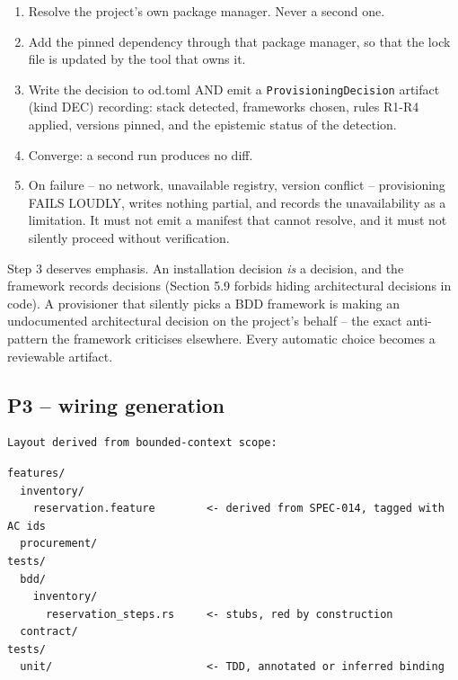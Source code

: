 \documentclass[11pt,a4paper]{article}
\begin{document}
\begin{enumerate}[leftmargin=*,nosep,topsep=2pt]
\item Resolve the project's own package manager. Never a second one.
\item Add the pinned dependency through that package manager, so that the lock    file is updated by the tool that owns it.
\item Write the decision to od.toml AND emit a \texttt{ProvisioningDecision} artifact    (kind DEC) recording: stack detected, frameworks chosen, rules R1-R4    applied, versions pinned, and the epistemic status of the detection.
\item Converge: a second run produces no diff.
\item On failure -- no network, unavailable registry, version conflict --    provisioning FAILS LOUDLY, writes nothing partial, and records the    unavailability as a limitation. It must not emit a manifest that cannot    resolve, and it must not silently proceed without verification.
\end{enumerate}

Step 3 deserves emphasis. An installation decision \emph{is} a decision, and the framework records decisions (Section 5.9 forbids hiding architectural decisions in code). A provisioner that silently picks a BDD framework is making an undocumented architectural decision on the project's behalf -- the exact anti-pattern the framework criticises elsewhere. Every automatic choice becomes a reviewable artifact.

\subsection{P3 -- wiring generation}

\begin{Verbatim}[fontsize=\footnotesize,breaklines=true,breakanywhere=true,breakautoindent=false,samepage=false]
Layout derived from bounded-context scope:
\end{Verbatim}

\begin{Verbatim}[fontsize=\footnotesize,breaklines=true,breakanywhere=true,breakautoindent=false,samepage=false]
features/
  inventory/
    reservation.feature        <- derived from SPEC-014, tagged with AC ids
  procurement/
tests/
  bdd/
    inventory/
      reservation_steps.rs     <- stubs, red by construction
  contract/
tests/
  unit/                        <- TDD, annotated or inferred binding
\end{Verbatim}
\end{document}
